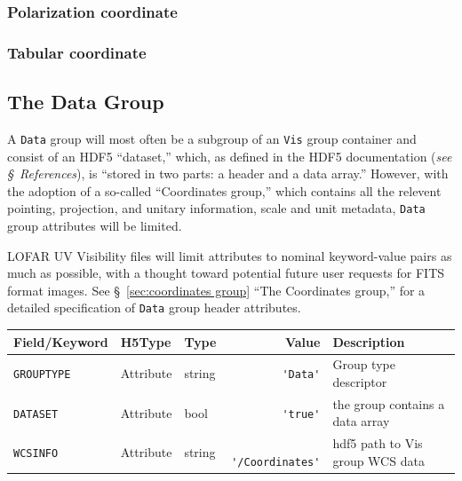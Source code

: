 \documentclass[a4paper,10pt,bibtotoc]{scrartcl}
\begin{document}
\subsubsection{Polarization coordinate}
\label{sec:polarization coordinate}



\subsubsection{Tabular coordinate}
\label{sec:coord-tabular}



\subsection{The Data Group}

A \texttt{Data} group will most often be a subgroup of an \texttt{Vis} group  container and consist of an HDF5 ``dataset,'' which, as defined in the HDF5 documentation (\textit{see \S\ References}), is ``stored in two parts: a header and a data array.''  However, with the adoption of a so-called ``Coordinates group,'' which contains all the relevent pointing, projection, and unitary information, scale and unit metadata, \texttt{Data} group attributes will be limited. 

LOFAR UV Visibility files will limit attributes to nominal keyword-value pairs as much as possible, with a thought toward potential future user requests for FITS format images.  See \S\ \ref{sec:coordinates group} ``The Coordinates group,'' for a detailed specification of \texttt{Data} group header attributes.

\begin{table}[ht]
  \centering
  \begin{tabular}{|lllrl|}
    \hline
    \sc Field/Keyword & \sc H5Type & \sc Type & \sc Value & \sc Description \\
    \hline \hline
    \small{\verb|GROUPTYPE|}   & Attribute & string &\verb| 'Data'|& Group type descriptor \\
    \small{\verb|DATASET|}       & Attribute & bool   &\verb| 'true'| & the group contains a data array \\
   \small{\verb|WCSINFO|}       & Attribute & string &\verb| '/Coordinates'| & hdf5 path to Vis group WCS data \\
    \hline
  \end{tabular}
\end{table}
\end{document}
